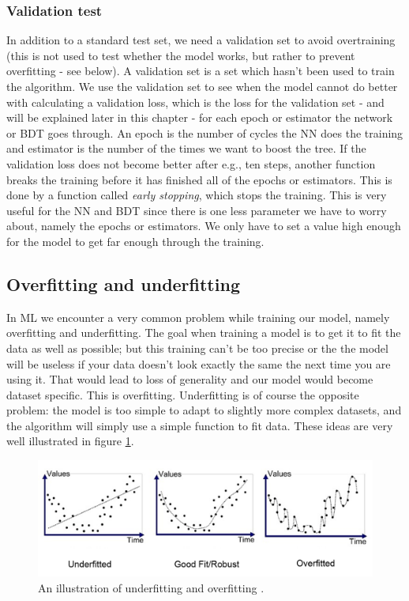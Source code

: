 \subsubsection{Validation test}
In addition to a standard test set, we need a validation set to avoid overtraining (this is not used to test whether the model works, but rather to prevent overfitting - see below). A validation set is a set which hasn't been used to train the algorithm. We use the validation set to see when the model cannot do better with calculating a validation loss, which is the loss for the validation set - and will be explained later in this chapter - for each epoch or estimator the network or BDT goes through. An epoch is the number of cycles the NN does the training and estimator is the number of the times we want to boost the tree. If the validation loss does not become better after e.g., ten steps, another function breaks the training before it has finished all of the epochs or estimators. This is done by a function called \textit{early stopping}, which stops the training. This is very useful for the NN and BDT since there is one less parameter we have to worry about, namely the epochs or estimators. We only have to set a value high enough for the model to get far enough through the training. 

\subsection{Overfitting and underfitting}
In ML we encounter a very common problem while training our model, namely overfitting and underfitting. The goal when training a model is to get it to fit the data as well as possible; but this training can't be too precise or the the model will be useless if your data doesn't look exactly the same the next time you are using it. That would lead to loss of generality and our model would become dataset specific. This is overfitting. Underfitting is of course the opposite problem: the model is too simple to adapt to slightly more complex datasets, and the algorithm will simply use a simple function to fit data. These ideas are very well illustrated in figure \ref{fig:overunderfitting}. 

\begin{figure}[H]
    \centering
    \includegraphics[width = \textwidth]{Figures/FromOnline/overunderfitting.png}
    \caption{An illustration of underfitting and overfitting \cite{overunderfittingpic}.}
    \label{fig:overunderfitting}
\end{figure}



